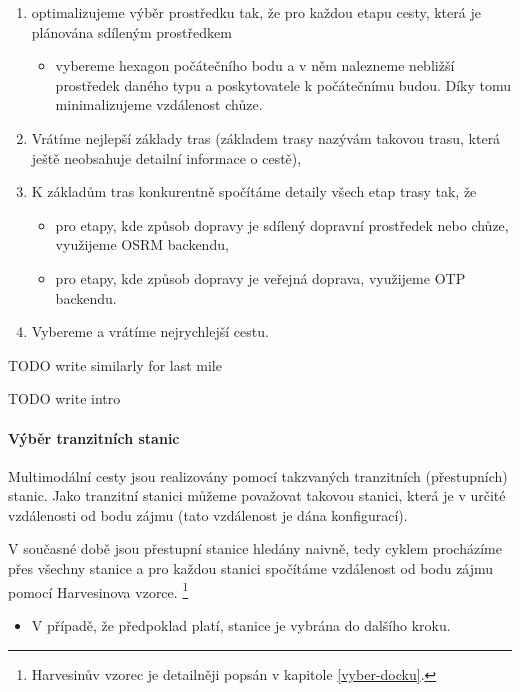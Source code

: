 \documentclass[thesis=M,czech]{FITthesis}[2019/12/23]
\theoremstyle{plain}
\theoremstyle{definition}
\begin{document}
\begin{enumerate}
	\item optimalizujeme výběr prostředku tak, že pro každou etapu cesty, která je plánována sdíleným prostředkem
	\begin{itemize}
		\item vybereme hexagon počátečního bodu a v něm nalezneme nebližší prostředek daného typu a poskytovatele k počátečnímu budou. Díky tomu minimalizujeme vzdálenost chůze.
	\end{itemize}
	\item Vrátíme nejlepší základy tras (základem trasy nazývám takovou trasu, která ještě neobsahuje detailní informace o cestě),
	\item K základům tras konkurentně spočítáme detaily všech etap trasy tak, že
	\begin{itemize}
		\item pro etapy, kde způsob dopravy je sdílený dopravní prostředek nebo chůze, využijeme OSRM backendu,
		\item pro etapy, kde způsob dopravy je veřejná doprava, využijeme OTP backendu.
	\end{itemize}
	\item Vybereme a vrátíme nejrychlejší cestu.




\end{enumerate}

TODO write similarly for last mile



TODO write intro


\paragraph{Výběr tranzitních stanic} \label{vyber-tranzitnich-stanic}

Multimodální cesty jsou realizovány pomocí takzvaných tranzitních (přestupních) stanic. Jako tranzitní stanici můžeme považovat takovou stanici, která je v určité vzdálenosti od bodu zájmu (tato vzdálenost je dána konfigurací). 

V současné době jsou přestupní stanice hledány naivně, tedy cyklem procházíme přes všechny stanice a pro každou stanici spočítáme vzdálenost od bodu zájmu pomocí Harvesinova vzorce\cite{harvesine}. \footnote{Harvesinův vzorec je detailněji popsán v kapitole \ref{vyber-docku}.}
	\begin{itemize}
		\item V případě, že předpoklad platí, stanice je vybrána do dalšího kroku.
	\end{itemize}
\end{document}
